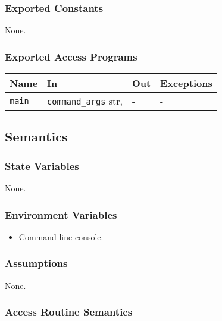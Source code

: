 \documentclass[12pt, titlepage]{article}
\begin{document}
\subsubsection{Exported Constants}
None.

\subsubsection{Exported Access Programs}

\begin{center}
\begin{tabular}{p{2cm} p{5.6cm} p{3cm} p{2cm}}
\hline
\textbf{Name} & \textbf{In} & \textbf{Out} & \textbf{Exceptions} \\
\hline
\texttt{main} & \texttt{command\_args} str, & - & - \\
\hline
\end{tabular}
\end{center}

\subsection{Semantics}

\subsubsection{State Variables}
None.

\subsubsection{Environment Variables}
\begin{itemize}
  \item Command line console.
\end{itemize}

\subsubsection{Assumptions}
None.

\subsubsection{Access Routine Semantics}
\end{document}
